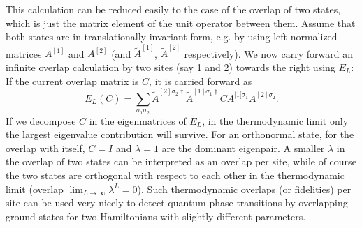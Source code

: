This calculation can be reduced easily to the case of the overlap of two states, which is just the matrix element of the unit operator between them. Assume that both states are in translationally invariant form, e.g. by using left-normalized matrices $A^{[1]}$ and $A^{[2]}$ (and $\tilde{A}^{[1]}$, $\tilde{A}^{[2]}$ respectively). We now carry forward an infinite overlap calculation by two sites (say 1 and 2) towards the right using $E_L$: If the current overlap matrix is $C$, it is carried forward as
\begin{equation}
E_L (C) = \sum_{\sigma_1\sigma_2} \tilde{A}^{[2]\sigma_2\dagger} \tilde{A}^{[1]\sigma_1\dagger} C A^{[1[\sigma_1} A^{[2]\sigma_2} .
\end{equation}  
If we decompose $C$ in the eigenmatrices of $E_L$, in the thermodynamic limit only the largest eigenvalue contribution will survive. For an orthonormal state, for the overlap with itself, $C=I$ and $\lambda=1$ are the dominant eigenpair. A smaller $\lambda$ in the overlap of two states can be interpreted as an overlap per site, while of course the two states are orthogonal with respect to each other in the thermodynamic limit (overlap $\lim_{L\rightarrow\infty} \lambda^L = 0$). Such thermodynamic overlaps (or fidelities) per site can be used very nicely to detect quantum phase transitions by overlapping ground states for two Hamiltonians with slightly different parameters\cite{McCulloch08}.
 
